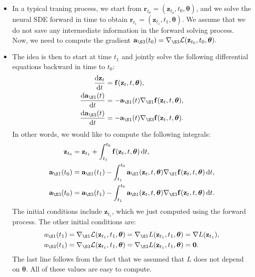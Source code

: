 \documentclass[10pt]{article}
\newcommand{\dee}{\mathrm{d}}
\newcommand{\ve}[1]{\mathbf{#1}}
\newcommand{\ves}[1]{\boldsymbol{#1}}
\newcommand{\mcal}[1]{\mathcal{#1}}
\begin{document}
\begin{itemize}
  \item In a typical traning process, we start from $\ve{r}_{t_0} = (\ve{z}_{t_0}, t_0, \ves{\theta})$, and we solve the neural SDE forward in time to obtain $\ve{r}_{t_1} = (\ve{z}_{t_1}, t_1, \ves{\theta})$. We assume that we do not save any intermediate information in the forward solving process. Now, we need to compute the gradient $\ve{a}_{\S3}(t_0) = \nabla_{\S3}\mcal{L}(\ve{z}_{t_0}, t_0, \ves{\theta}).$
    
  \item The idea is then to start at time $t_1$ and jointly solve the following differential equations backward in time to $t_0$:
  \begin{align*}
    \frac{\dee \ve{z}_t}{\dee t} &= \ve{f}(\ve{z}_t, t, \ves{\theta}), \\
    \frac{\dee \ve{a}_{\S1}(t)}{\dee t} &= -\ve{a}_{\S 1}(t) \nabla_{\S 1}\ve{f}(\ve{z}_t, t, \ves{\theta}), \\
    \frac{\dee \ve{a}_{\S3}(t)}{\dee t} &= -\ve{a}_{\S 1}(t) \nabla_{\S 3}\ve{f}(\ve{z}_t, t, \ves{\theta}).
  \end{align*}
  In other words, we would like to compute the following integrals:
  \begin{align*}
    \ve{z}_{t_0} &= \ve{z}_{t_1} + \int_{t_1}^{t_0} \ve{f}(\ve{z}_t, t, \ves{\theta})\, \dee t, \\
    \ve{a}_{\S1}(t_0) &= \ve{a}_{\S1}(t_1) - \int_{t_1}^{t_0} \ve{a}_{\S 1}(\ve{z}_t, t, \ves{\theta}) \nabla_{\S 1}\ve{f}(\ve{z}_t, t, \ves{\theta})\, \dee t, \\
    \ve{a}_{\S3}(t_0) &= \ve{a}_{\S3}(t_1) - \int_{t_1}^{t_0} \ve{a}_{\S 1}(\ve{z}_t, t, \ves{\theta}) \nabla_{\S 3}\ve{f}(\ve{z}_t, t, \ves{\theta})\, \dee t.
  \end{align*}
  The initial conditions include $\ve{z}_{t_1}$, which we just computed using the forward process. The other initial conditions are:
  \begin{align*}
    a_{\S1}(t_1) 
    &= \nabla_{\S1}\mcal{L}(\ve{z}_{t_1},t_1,\ves{\theta}) = \nabla_{\S1}L(\ve{z}_{t_1},t_1,\ves{\theta}) = \nabla L(\ve{z}_{t_1}), \\
    a_{\S3}(t_1) 
    &= \nabla_{\S3}\mcal{L}(\ve{z}_{t_1},t_1,\ves{\theta})
    = \nabla_{\S3}L(\ve{z}_{t_1},t_1,\ves{\theta}) 
    = \ve{0}.
  \end{align*} 
  The last line follows from the fact that we assumed that $L$ does not depend on $\ves{\theta}$. All of these values are easy to compute.


\end{itemize}
\end{document}
